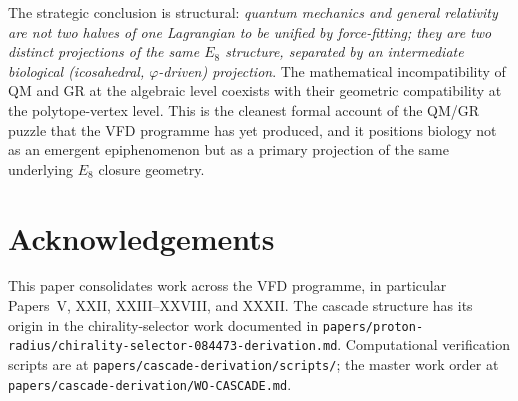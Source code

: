 \documentclass[12pt]{article}
\begin{document}
The strategic conclusion is structural: \emph{quantum mechanics and general relativity are not two halves of one Lagrangian to be unified by force-fitting; they are two distinct projections of the same $E_8$ structure, separated by an intermediate biological (icosahedral, $\varphi$-driven) projection}. The mathematical incompatibility of QM and GR at the algebraic level coexists with their geometric compatibility at the polytope-vertex level. This is the cleanest formal account of the QM/GR puzzle that the VFD programme has yet produced, and it positions biology not as an emergent epiphenomenon but as a primary projection of the same underlying $E_8$ closure geometry.

\section*{Acknowledgements}

This paper consolidates work across the VFD programme, in particular Papers~V, XXII, XXIII--XXVIII, and XXXII. The cascade structure has its origin in the chirality-selector work documented in \texttt{papers/proton-radius/chirality-selector-084473-derivation.md}. Computational verification scripts are at \texttt{papers/cascade-derivation/scripts/}; the master work order at \texttt{papers/cascade-derivation/WO-CASCADE.md}.
\end{document}
